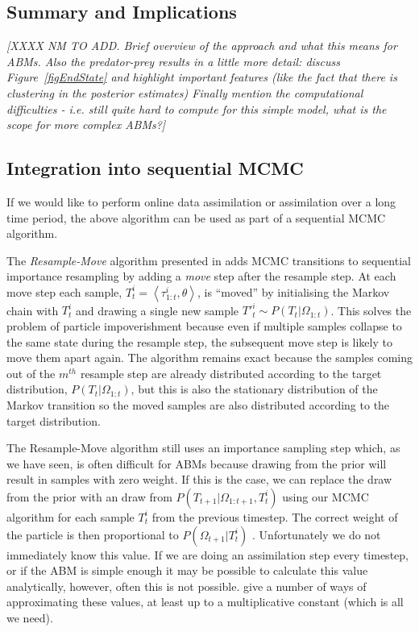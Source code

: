 \documentclass{article}
\begin{document}
\subsection{Summary and Implications}

\textit{[XXXX NM TO ADD. 
Brief overview of the approach and what this means for ABMs. 
Also the predator-prey results in a little more detail: discuss Figure~\ref{figEndState} and highlight important features (like the fact that there is clustering in the posterior estimates)
Finally mention the computational difficulties - i.e. still quite hard to compute for this simple model, what is the scope for more complex ABMs?]}



\subsection{Integration into sequential MCMC}

If we would like to perform online data assimilation or assimilation over a long time period, the above algorithm can be used as part of a sequential MCMC algorithm.

The \textit{Resample-Move} algorithm presented in \citet{gilks2001following} adds MCMC transitions to sequential importance resampling by adding a \textit{move} step after the resample step. At each move step each sample, $T^i_t = \left<\tau_{1:t}^i,\theta\right>$, is ``moved'' by initialising the Markov chain with $T^i_t$ and drawing a single new sample $T'^{i}_{t} \sim P(T_t|\Omega_{1:t})$. This solves the problem of particle impoverishment because even if multiple samples collapse to the same state during the resample step, the subsequent move step is likely to move them apart again. The algorithm remains exact because the samples coming out of the $m^{th}$ resample step are already distributed according to the target distribution, $P(T_t|\Omega_{1:t})$, but this is also the stationary distribution of the Markov transition so the moved samples are also distributed according to the target distribution.

The Resample-Move algorithm still uses an importance sampling step which, as we have seen, is often difficult for ABMs because drawing from the prior will result in samples with zero weight. If this is the case, we can replace the draw from the prior with an draw from $P(T_{t+1}|\Omega_{1:{t+1}},T^i_t)$ using our MCMC algorithm for each sample $T^i_t$ from the previous timestep. The correct weight of the particle is then proportional to $P(\Omega_{t+1}|T^i_t)$ \citep{doucet2009tutorial}. Unfortunately we do not immediately know this value. If we are doing an assimilation step every timestep, or if the ABM is simple enough it may be possible to calculate this value analytically, however, often this is not possible.   \citet*{han2001markov, newton1994approximate, stefankovic2009adaptive} give a number of ways of approximating these values, at least up to a multiplicative constant (which is all we need).
\end{document}
